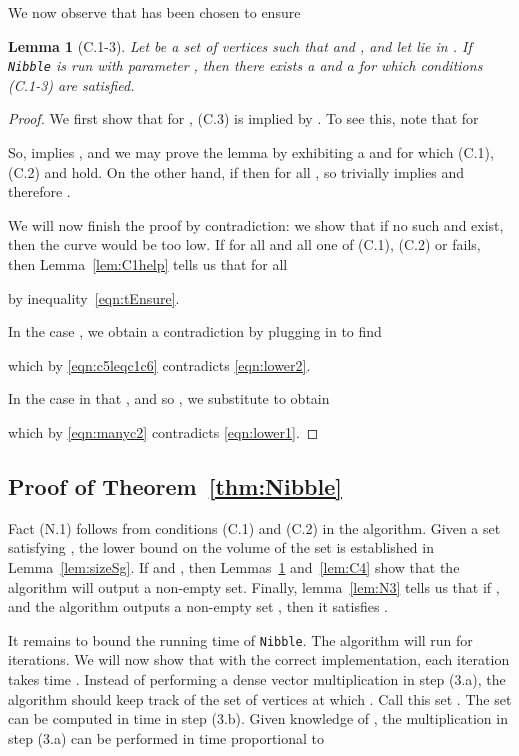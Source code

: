 \documentclass[11pt]{article}
\newtheorem{lemma}[theorem]{Lemma}
\begin{document}
We now observe that  has been chosen to ensure



\begin{lemma}[C.1-3]\label{lem:C123}
Let  be a set of vertices such that
  and
  , and
  let  lie in .
If \texttt{Nibble} is run with parameter ,
  then there exists a  and a 
  for which conditions (C.1-3) are satisfied.
\end{lemma}
\begin{proof}
We first show that for , (C.3) is implied
  by .
To see  this, note that for 

So, 
  implies ,
 and we may prove the lemma by exhibiting a  and  for which
  (C.1), (C.2) and 
  hold.
On the other hand, if  then 
  for all , so 
  trivially implies  and therefore .

We will now finish the proof by contradiction: we show that if no
  such  and  exist, then the curve 
  would be too low.
If for all  
  and all  one of (C.1), (C.2) or 
   fails,
  then Lemma~\ref{lem:C1help} tells us that for all 

by inequality~\eqref{eqn:tEnsure}.

In the case ,
  we obtain a contradiction by 
  plugging in   to find

which by \eqref{eqn:c5leqc1c6} contradicts \eqref{eqn:lower2}.

In the case in that ,
  and so , we
  substitute  to obtain

which by \eqref{eqn:manyc2} contradicts \eqref{eqn:lower1}.
\end{proof}

\subsection{Proof of Theorem~\ref{thm:Nibble}}

Fact (N.1) follows from conditions (C.1) and (C.2)
  in the algorithm.
Given a set  satisfying ,
  the lower bound on the volume of the set 
  is established in Lemma~\ref{lem:sizeSg}.
If  and ,
  then Lemmas~\ref{lem:C123} and~\ref{lem:C4} show that
  the algorithm will output a non-empty set.
Finally, lemma~\ref{lem:N3} tells us that if ,
   and the algorithm outputs a non-empty set ,
  then it satisfies .

It remains to bound the running time of \texttt{Nibble}.
The algorithm will run for 
  iterations.
We will now show that with the correct implementation, each iteration
  takes time .
Instead of performing a dense vector multiplication in step (3.a),
  the algorithm should keep track of the set of vertices 
  at which .
Call this set .
The set  can be computed in time 
  in step (3.b).
Given knowledge of , the multiplication in step (3.a)
  can be performed in time proportional to 
\end{document}
